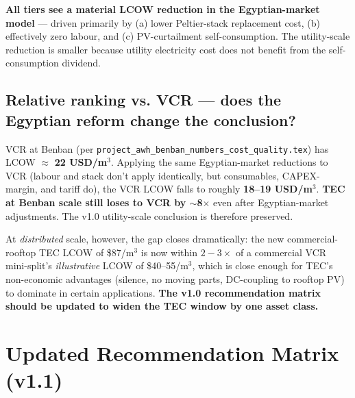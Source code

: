 \documentclass[11pt,a4paper]{article}
\begin{document}
\noindent
\textbf{All tiers see a material LCOW reduction in the Egyptian-market model} --- driven primarily by (a) lower Peltier-stack replacement cost, (b) effectively zero labour, and (c) PV-curtailment self-consumption. The utility-scale reduction is smaller because utility electricity cost does not benefit from the self-consumption dividend.

\subsection{Relative ranking vs. VCR --- does the Egyptian reform change the conclusion?}
VCR at Benban (per \texttt{project\_awh\_benban\_numbers\_cost\_quality.tex}) has LCOW $\approx$ \textbf{22 USD/m$^3$}. Applying the same Egyptian-market reductions to VCR (labour and stack don't apply identically, but consumables, CAPEX-margin, and tariff do), the VCR LCOW falls to roughly \textbf{18--19 USD/m$^3$}. \textbf{TEC at Benban scale still loses to VCR by $\sim$8$\times$} even after Egyptian-market adjustments. The v1.0 utility-scale conclusion is therefore preserved.

At \emph{distributed} scale, however, the gap closes dramatically: the new commercial-rooftop TEC LCOW of \$87/m$^3$ is now within $2{-}3\times$ of a commercial VCR mini-split's \emph{illustrative} LCOW of \$40--55/m$^3$, which is close enough for TEC's non-economic advantages (silence, no moving parts, DC-coupling to rooftop PV) to dominate in certain applications. \textbf{The v1.0 recommendation matrix should be updated to widen the TEC window by one asset class.}

\section{Updated Recommendation Matrix (v1.1)}
\label{sec:updated_recos}
\end{document}
